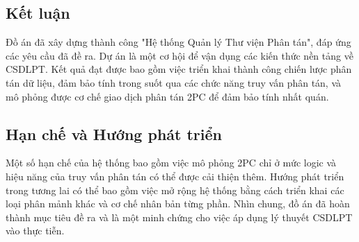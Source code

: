 \documentclass[conference]{IEEEtran}
\begin{document}
\subsection{Kết luận}
Đồ án đã xây dựng thành công "Hệ thống Quản lý Thư viện Phân tán", đáp ứng các yêu cầu đã đề ra. Dự án là một cơ hội để vận dụng các kiến thức nền tảng về CSDLPT. Kết quả đạt được bao gồm việc triển khai thành công chiến lược phân tán dữ liệu, đảm bảo tính trong suốt qua các chức năng truy vấn phân tán, và mô phỏng được cơ chế giao dịch phân tán 2PC để đảm bảo tính nhất quán.

\subsection{Hạn chế và Hướng phát triển}
Một số hạn chế của hệ thống bao gồm việc mô phỏng 2PC chỉ ở mức logic và hiệu năng của truy vấn phân tán có thể được cải thiện thêm. Hướng phát triển trong tương lai có thể bao gồm việc mở rộng hệ thống bằng cách triển khai các loại phân mảnh khác và cơ chế nhân bản từng phần. Nhìn chung, đồ án đã hoàn thành mục tiêu đề ra và là một minh chứng cho việc áp dụng lý thuyết CSDLPT vào thực tiễn.

\end{document}
